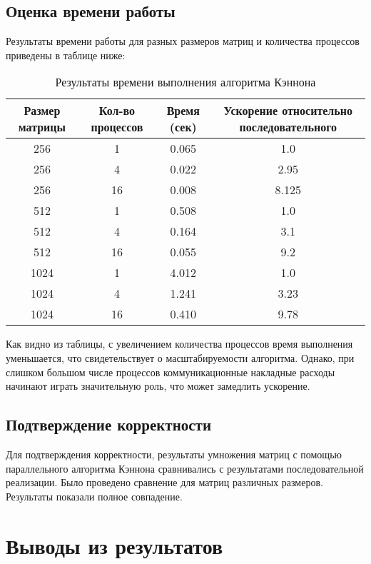 \documentclass[12pt]{article}
\begin{document}
\subsection{Оценка времени работы}
Результаты времени работы для разных размеров матриц и количества процессов приведены в таблице ниже:
\begin{table}[h!]
    \centering
    \begin{tabular}{|c|c|c|c|}
        \hline
        Размер матрицы & Кол-во процессов & Время (сек) & Ускорение относительно последовательного \\
        \hline
        256 & 1 & 0.065 & 1.0 \\
        256 & 4 & 0.022 & 2.95  \\
        256 & 16 & 0.008 & 8.125 \\
        \hline
        512 & 1 & 0.508 & 1.0\\
        512 & 4 & 0.164 & 3.1 \\
        512 & 16 & 0.055 & 9.2  \\
         \hline
        1024 & 1 & 4.012 & 1.0 \\
        1024 & 4 & 1.241 & 3.23  \\
        1024 & 16 & 0.410 & 9.78  \\
         \hline
    \end{tabular}
    \caption{Результаты времени выполнения алгоритма Кэннона}
    \label{tab:results}
\end{table}
Как видно из таблицы, с увеличением количества процессов время выполнения уменьшается, что свидетельствует о масштабируемости алгоритма. Однако, при слишком большом числе процессов коммуникационные накладные расходы начинают играть значительную роль, что может замедлить ускорение.

\subsection{Подтверждение корректности}

Для подтверждения корректности, результаты умножения матриц с помощью параллельного алгоритма Кэннона сравнивались с результатами последовательной реализации. Было проведено сравнение для матриц различных размеров. Результаты показали полное совпадение.

\section{Выводы из результатов}
\end{document}
